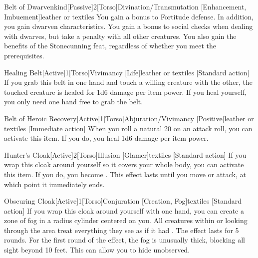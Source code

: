         \begin{magicitemdef}{Belt of Dwarvenkind}[Passive]{2}[Torso]{Divination/Transmutation [Enhancement, Imbuement]}{leather or textiles}
             You gain a  bonus to Fortitude defense.
            In addition, you gain dwarven characteristics.
            You gain a  bonus to social checks when dealing with dwarves, but take a  penalty with all other creatures.
            You also gain the benefits of the Stonecunning feat, regardless of whether you meet the prerequisites.
        \end{magicitemdef}

        \begin{magicitemdef}{Healing Belt}[Active]{1}[Torso]{Vivimancy [Life]}{leather or textiles}
            [Standard action] If you grab this belt in one hand and touch a willing creature with the other, the touched creature is healed for 1d6 damage per item power.
            If you heal yourself, you only need one hand free to grab the belt.
        \end{magicitemdef}

        \begin{magicitemdef}{Belt of Heroic Recovery}[Active]{1}[Torso]{Abjuration/Vivimancy [Positive]}{leather or textiles}
            [Immediate action] When you roll a natural 20 on an attack roll, you can activate this item. If you do, you heal 1d6 damage per item power.
        \end{magicitemdef}

        \begin{magicitemdef}{Hunter's Cloak}[Active]{2}[Torso]{Illusion [Glamer]}{textiles}
            [Standard action] If you wrap this cloak around yourself so it covers your whole body, you can activate this item.
            If you do, you become .
            This effect lasts until you move or attack, at which point it immediately ends.
        \end{magicitemdef}

        \begin{magicitemdef}{Obscuring Cloak}[Active]{1}[Torso]{Conjuration [Creation, Fog]}{textiles}
            [Standard action] If you wrap this cloak around yourself with one hand, you can create a zone of fog in a \areamed radius cylinder centered on you.
            All creatures within or looking through the area treat everything they see as if it had \concealment.
            The effect lasts for 5 rounds.
            For the first round of the effect, the fog is unusually thick, blocking all sight beyond 10 feet.
            This can allow you to hide unobserved.
        \end{magicitemdef}

